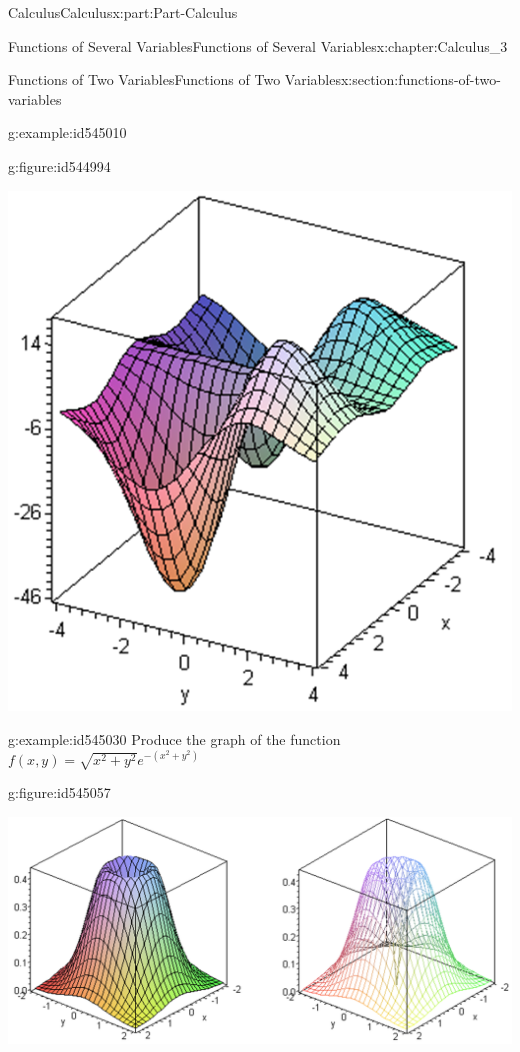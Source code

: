 \documentclass[oneside,10pt,]{book}
\numberwithin{equation}{section}
\begin{document}
\begin{partptx}{Calculus}{}{Calculus}{}{}{x:part:Part-Calculus}
\begin{chapterptx}{Functions of Several Variables}{}{Functions of Several Variables}{}{}{x:chapter:Calculus_3}
\begin{sectionptx}{Functions of Two Variables}{}{Functions of Two Variables}{}{}{x:section:functions-of-two-variables}
\begin{example}{}{g:example:id545010}
\begin{figureptx}{}{g:figure:id544994}{}
\begin{image}{0.125}{0.75}{0.125}
\includegraphics[width=\linewidth]{./Calculus/Images/3/1_example5.png}
\end{image}%
\tcblower
\end{figureptx}%
%
\end{example}
\begin{example}{}{g:example:id545030}%
Produce the graph of the function \(f(x,y)=\sqrt{x^2+y^2}e^{-(x^2+y^2)}\)%
\par\smallskip%
\noindent\hypertarget{g:solution:id545028}{}\begin{figureptx}{}{g:figure:id545057}{}%
\begin{image}{0}{1}{0}%
\includegraphics[width=\linewidth]{./Calculus/Images/3/1_example6.png}
\end{image}%

\end{figureptx}
\end{example}
\end{sectionptx}
\end{chapterptx}
\end{partptx}
\end{document}
